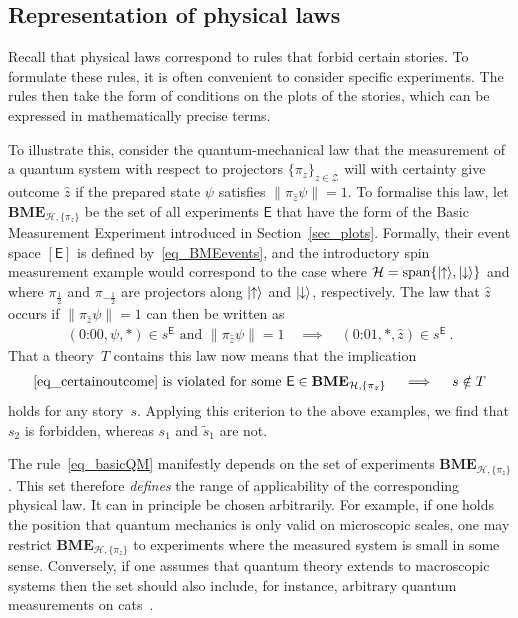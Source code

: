\documentclass[12pt]{article}
\theoremstyle{plain}
\theoremstyle{definition}
\newcommand*{\cH}{\mathcal{H}}
\newcommand*{\cZ}{\mathcal{Z}}
\newcommand*{\ket}[1]{{| #1 \rangle}}
\newcommand*{\Exp}{\mathsf{E}}
\newcommand*{\BME}{\mathbf{BME}}
\newcommand*{\spinup}{\ket{{\hspace{-0.1ex}\uparrow\hspace{-0.1ex}}}}
\newcommand*{\spindown}{\ket{{\hspace{-0.1ex}\downarrow\hspace{-0.1ex}}}}
\begin{document}
\subsection{Representation of physical laws}

Recall that physical laws correspond to rules that forbid certain stories.  To formulate these rules, it is often convenient to consider  specific experiments. The rules then take the form of conditions on the plots of the stories, which can be expressed in mathematically precise terms.  

To illustrate this, consider the quantum-mechanical law that the measurement of a quantum system with respect to projectors $\{\pi_{z}\}_{z \in \cZ}$ will with certainty give outcome $\hat{z}$ if the prepared state $\psi$ satisfies $\|\pi_{\hat{z}} \psi \| = 1$.  To formalise this law, let  $\BME_{\cH, \{\pi_z\}}$ be the set of all experiments $\Exp$ that have the form of the Basic Measurement Experiment introduced in Section~\ref{sec_plots}. Formally, their event space $[\Exp]$ is defined by~\eqref{eq_BMEevents}, and the introductory spin measurement example would correspond to the case where $\cH = \mathrm{span}\{\spinup, \spindown\}$ and  where $\pi_{\frac{1}{2}}$ and $\pi_{-\frac{1}{2}}$ are projectors along $\spinup$ and $\spindown$, respectively. The law that $\hat{z}$ occurs if $\|\pi_{\hat{z}} \psi \| = 1$ can then be written as 
\begin{align} \label{eq_certainoutcome}
   (\text{0:00}, \psi, *) \in s^{\Exp}  \text{ and } \|\pi_{\hat{z}} \psi \| = 1 \quad \implies \quad   (\text{0:01}, *, \hat{z}) \in s^{\Exp} \ .
\end{align}
That a theory~$T$ contains this law now means that the implication
\begin{align} \label{eq_basicQM}
  \text{\eqref{eq_certainoutcome} is violated for some $\Exp \in \BME_{\cH, \{\pi_z\}}$}  \quad \implies \quad s \notin T
  \end{align}
  holds for any story~$s$. Applying this criterion to the above examples, we find that $s_2$ is forbidden, whereas $s_1$ and $\tilde{s}_1$ are not.  

The rule~\eqref{eq_basicQM} manifestly depends on the set of experiments $\BME_{\cH, \{\pi_z\}}$. This set therefore \emph{defines} the range of applicability of the corresponding physical law. It can in principle be chosen arbitrarily.  For example, if one holds the position that quantum mechanics is only valid  on microscopic scales, one may restrict $\BME_{\cH, \{\pi_z\}}$ to experiments where the measured system is small in some sense. Conversely, if one assumes that quantum theory extends to macroscopic systems then the set should also include, for instance, arbitrary quantum measurements on cats~\cite{Schroedinger35}.
\end{document}
